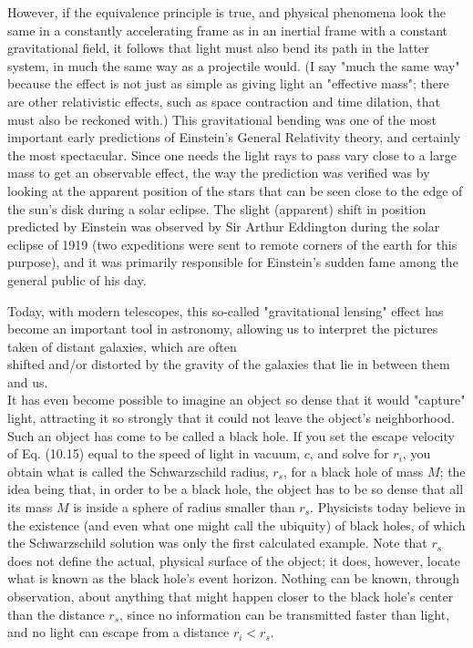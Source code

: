 \documentclass[10pt]{article}
\begin{document}
However, if the equivalence principle is true, and physical phenomena look the same in a constantly accelerating frame as in an inertial frame with a constant gravitational field, it follows that light must also bend its path in the latter system, in much the same way as a projectile would. (I say "much the same way" because the effect is not just as simple as giving light an "effective mass"; there are other relativistic effects, such as space contraction and time dilation, that must also be reckoned with.) This gravitational bending was one of the most important early predictions of Einstein's General Relativity theory, and certainly the most spectacular. Since one needs the light rays to pass vary close to a large mass to get an observable effect, the way the prediction was verified was by looking at the apparent position of the stars that can be seen close to the edge of the sun's disk during a solar eclipse. The slight (apparent) shift in position predicted by Einstein was observed by Sir Arthur Eddington during the solar eclipse of 1919 (two expeditions were sent to remote corners of the earth for this purpose), and it was primarily responsible for Einstein's sudden fame among the general public of his day.

Today, with modern telescopes, this so-called "gravitational lensing" effect has become an important tool in astronomy, allowing us to interpret the pictures taken of distant galaxies, which are often\\
shifted and/or distorted by the gravity of the galaxies that lie in between them and us.\\
It has even become possible to imagine an object so dense that it would "capture" light, attracting it so strongly that it could not leave the object's neighborhood. Such an object has come to be called a black hole. If you set the escape velocity of Eq. (10.15) equal to the speed of light in vacuum, $c$, and solve for $r_{i}$, you obtain what is called the Schwarzschild radius, $r_{s}$, for a black hole of mass $M$; the idea being that, in order to be a black hole, the object has to be so dense that all its mass $M$ is inside a sphere of radius smaller than $r_{s}$. Physicists today believe in the existence (and even what one might call the ubiquity) of black holes, of which the Schwarzschild solution was only the first calculated example. Note that $r_{s}$ does not define the actual, physical surface of the object; it does, however, locate what is known as the black hole's event horizon. Nothing can be known, through observation, about anything that might happen closer to the black hole's center than the distance $r_{s}$, since no information can be transmitted faster than light, and no light can escape from a distance $r_{i}<r_{s}$.
\end{document}
